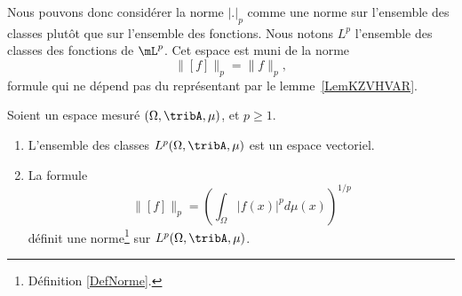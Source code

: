Nous pouvons donc considérer la norme \( | . |_p\) comme une norme sur l'ensemble des classes plutôt que sur l'ensemble des fonctions. Nous notons \( L^p\) l'ensemble des classes des fonctions de \(\mL^p\). Cet espace est muni de la norme
\begin{equation}
	\| [f] \|_p=\| f \|_p,
\end{equation}
formule qui ne dépend pas du représentant par le lemme~\ref{LemKZVHVAR}.

\begin{proposition}     \label{PROPooTYCYooAKJWOX}
	Soient un espace mesuré \( (\Omega,\tribA,\mu)\), et \( p\geq 1\).
	\begin{enumerate}
		\item
		      L'ensemble des classes \( L^p(\Omega,\tribA,\mu)\) est un espace vectoriel.
		\item		\label{ITEMooZNXPooGzFnIK}
		      La formule
		      \begin{equation}
			      \| [f] \|_p=\left( \int_{\Omega}| f(x) |^pd\mu(x) \right)^{1/p}
		      \end{equation}
		      définit une norme\footnote{Définition \ref{DefNorme}.} sur \( L^p(\Omega,\tribA,\mu)\).
	\end{enumerate}
\end{proposition}

